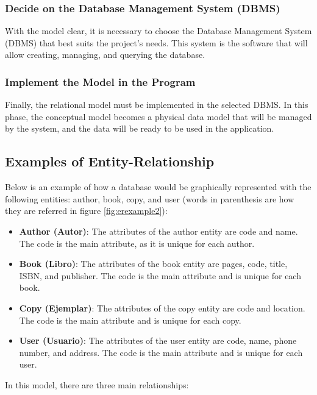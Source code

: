 \documentclass{article}
\begin{document}
\subsubsection{Decide on the Database Management System (DBMS)}

With the model clear, it is necessary to choose the Database Management System (DBMS) that best suits the project's needs. This system is the software that will allow creating, managing, and querying the database.

\subsubsection{Implement the Model in the Program}

Finally, the relational model must be implemented in the selected DBMS. In this phase, the conceptual model becomes a physical data model that will be managed by the system, and the data will be ready to be used in the application.

\subsection{Examples of Entity-Relationship} \label{sec:example}

Below is an example of how a database would be graphically represented with the following entities: author, book, copy, and user (words in parenthesis are how they are referred in figure \ref{fig:erexample2}):

\begin{itemize}
    \item \textbf{Author (Autor)}: The attributes of the author entity are code and name. The code is the main attribute, as it is unique for each author.
    \item \textbf{Book (Libro)}: The attributes of the book entity are pages, code, title, ISBN, and publisher. The code is the main attribute and is unique for each book.
    \item \textbf{Copy (Ejemplar)}: The attributes of the copy entity are code and location. The code is the main attribute and is unique for each copy.
    \item \textbf{User (Usuario)}: The attributes of the user entity are code, name, phone number, and address. The code is the main attribute and is unique for each user.
\end{itemize}

In this model, there are three main relationships:
\end{document}

